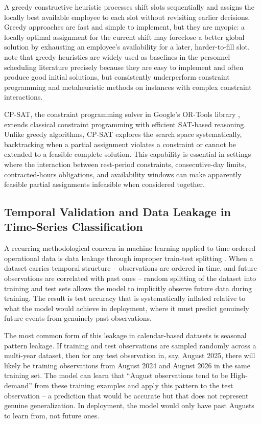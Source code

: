 \documentclass[12pt,a4paper,oneside]{article}
\begin{document}
A greedy constructive heuristic processes shift slots sequentially and assigns the locally best available employee to each slot without revisiting earlier decisions. Greedy approaches are fast and simple to implement, but they are myopic: a locally optimal assignment for the current shift may foreclose a better global solution by exhausting an employee's availability for a later, harder-to-fill slot. \citet{bergh2013} note that greedy heuristics are widely used as baselines in the personnel scheduling literature precisely because they are easy to implement and often produce good initial solutions, but consistently underperform constraint programming and metaheuristic methods on instances with complex constraint interactions.

CP-SAT, the constraint programming solver in Google's OR-Tools library \citep{ortools2024}, extends classical constraint programming with efficient SAT-based reasoning. Unlike greedy algorithms, CP-SAT explores the search space systematically, backtracking when a partial assignment violates a constraint or cannot be extended to a feasible complete solution. This capability is essential in settings where the interaction between rest-period constraints, consecutive-day limits, contracted-hours obligations, and availability windows can make apparently feasible partial assignments infeasible when considered together.

\subsection{Temporal Validation and Data Leakage in Time-Series Classification}

A recurring methodological concern in machine learning applied to time-ordered operational data is data leakage through improper train-test splitting \citep{bergmeir2012}. When a dataset carries temporal structure -- observations are ordered in time, and future observations are correlated with past ones -- random splitting of the dataset into training and test sets allows the model to implicitly observe future data during training. The result is test accuracy that is systematically inflated relative to what the model would achieve in deployment, where it must predict genuinely future events from genuinely past observations.

The most common form of this leakage in calendar-based datasets is seasonal pattern leakage. If training and test observations are sampled randomly across a multi-year dataset, then for any test observation in, say, August 2025, there will likely be training observations from August 2024 and August 2026 in the same training set. The model can learn that ``August observations tend to be High-demand'' from these training examples and apply this pattern to the test observation -- a prediction that would be accurate but that does not represent genuine generalization. In deployment, the model would only have past Augusts to learn from, not future ones.
\end{document}
